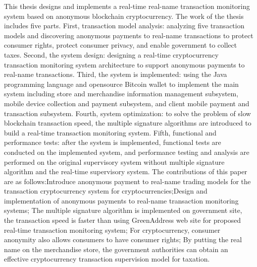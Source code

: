 \begin{eabstract}
	This thesis designs and implements a real-time real-name transaction monitoring system based on anonymous blockchain cryptocurrency. The work of the thesis includes five parts. First, transaction model analysis: analyzing five transaction models and discovering anonymous payments to real-name transactions to protect consumer rights, protect consumer privacy, and enable government to collect taxes. Second, the system design: designing a real-time cryptocurrency transaction monitoring system architecture to support anonymous payments to real-name transactions. Third, the system is implemented: using the Java programming language and opensource Bitcoin wallet to implement the main system including store and merchandise information management subsystem, mobile device collection and payment subsystem, and client mobile payment and transaction subsystem. Fourth, system optimization: to solve the problem of slow blockchain transaction speed, the multiple signature algorithms are introduced to build a real-time transaction monitoring system. Fifth, functional and performance tests: after the system is implemented, functional tests are conducted on the implemented system, and performance testing and analysis are performed on the original supervisory system without multiple signature algorithm and the real-time supervisory system.
	The contributions of this paper are as follows:Introduce anonymous payment to real-name trading models for the transaction cryptocurrency system for cryptocurrencies;Design and implementation of anonymous payments to real-name transaction monitoring systems; The multiple signature algorithm is implemented on government site, the transaction speed is faster than using GreenAddress web site for proposed real-time transaction monitoring system; For cryptocurrency, consumer anonymity also allows consumers to have consumer rights; By putting the real name on the merchandise store, the government authorities can obtain an effective cryptocurrency transaction supervision model for taxation.

\end{eabstract}

